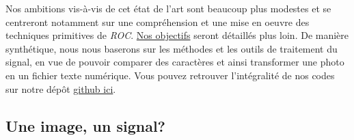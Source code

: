 \documentclass[a4paper,12pt,titlepage]{report}
\begin{document}
		Nos ambitions vis-à-vis de cet état de l'art sont beaucoup plus modestes et se centreront notamment sur une compréhension et une mise en oeuvre des techniques primitives de \textit{ROC}. \hyperref[objectifs]{Nos objectifs} seront détaillés plus loin. De manière synthétique, nous nous baserons sur les méthodes et les outils de traitement du signal, en vue de pouvoir comparer des caractères et ainsi transformer une photo en un fichier texte numérique. Vous pouvez retrouver l'intégralité de nos codes sur notre dépôt \href{https://github.com/tristanplouz/ProjetSignal}{github ici}.
		
		\vspace{-1em}
		
		\subsection{Une image, un signal?}	
		
		\vspace{-0.5em}
		
\end{document}
